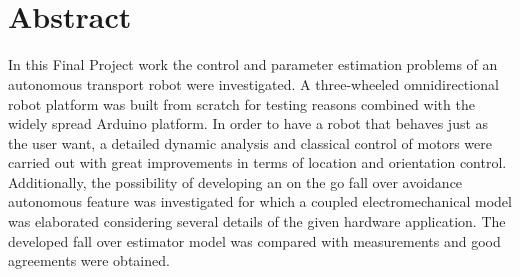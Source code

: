 \documentclass[12pt,english,twoside]{article}
\begin{document}
\thispagestyle{empty}
$~$
\newpage

\renewcommand{\contentsname}{Contents}
\renewcommand{\cftsecleader}{\cftdotfill{\cftdotsep}}
\tableofcontents
{} %
\thispagestyle{empty}
\newpage

\thispagestyle{empty}
$~$
\newpage

\section*{Abstract}
In this Final Project work the control and parameter estimation problems of an autonomous transport robot were investigated. A three-wheeled omnidirectional robot platform was built from scratch for testing reasons combined with the widely spread Arduino platform. In order to have a robot that behaves just as the user want, a detailed dynamic analysis and classical control of motors were carried out with great improvements in terms of location and orientation control. Additionally, the possibility of developing an on the go fall over avoidance autonomous feature was investigated for which a coupled electromechanical model was elaborated considering several details of the given hardware application. The developed fall over estimator model was compared with measurements and good agreements were obtained.
\newpage

\thispagestyle{empty}
$~$
\newpage
\end{document}
